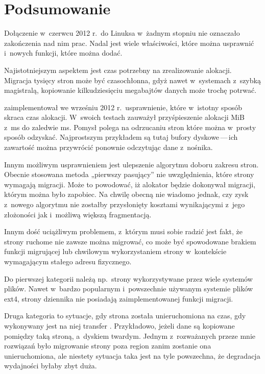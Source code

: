\section{Podsumowanie}

Dołączenie  w~czerwcu 2012 r.\ do Linuksa w~żadnym stopniu
nie oznaczało zakończenia nad nim prac.  Nadal jest wiele właściwości,
które można usprawnić i~nowych funkcji, które można dodać.

Najistotniejszym aspektem  jest czas potrzebny na zrealizowanie
alokacji.  Migracja tysięcy stron może być czasochłonna, gdyż nawet
w~systemach z~szybką magistralą, kopiowanie kilkudziesięciu megabajtów
danych może trochę potrwać.

\textcite{patch:cma-discard} zaimplementował we wrześniu 2012
r.\ usprawnienie, które w~istotny sposób skraca czas alokacji.
W~swoich testach zauważył przyśpieszenie alokacji \unit[10]{MiB}
z~\unit[146]{ms} do zaledwie \unit[7]{ms}.  Pomysł polega na
odrzucaniu stron które można w~prosty sposób odzyskać.  Najprostszym
przykładem są tutaj bufory dyskowe\,---\,ich zawartość można
przywrócić ponownie odczytując dane z~nośnika.

Innym możliwym usprawnieniem  jest ulepszenie algorytmu doboru
zakresu stron.  Obecnie stosowana metoda „pierwszy pasujący” nie
uwzględnienia, które strony wymagają migracji.  Może to powodować, iż
alokator będzie dokonywał migracji, którym można było zapobiec.  Na
chwilę obecną nie wiadomo jednak, czy zysk z~nowego algorytmu nie
zostałby przysłonięty kosztami wynikającymi z~jego złożoności jak
i~możliwą większą fragmentacją.

Innym dość uciążliwym problemem, z~którym  musi sobie radzić jest
fakt, że strony ruchome nie zawsze można migrować, co może być
spowodowane brakiem funkcji migrującej lub chwilowym wykorzystaniem
strony w~kontekście wymagającym stałego adresu fizycznego.

Do pierwszej kategorii należą np.\ strony wykorzystywane przez wiele
systemów plików.  Nawet w~bardzo popularnym i~powszechnie używanym
systemie plików ext4, strony dziennika nie posiadają zaimplementowanej
funkcji migracji.

Druga kategoria to sytuacje, gdy strona została unieruchomiona na
czas, gdy wykonywany jest na niej transfer .  Przykładowo,
jeżeli dane są kopiowane pomiędzy taką stroną, a~dyskiem twardym.
Jednym z~rozważanych przeze mnie rozwiązań było migrowanie strony poza
region  zanim zostanie ona unieruchomiona, ale niestety
sytuacja taka jest na tyle powszechna, że degradacja wydajności byłaby
zbyt duża.

